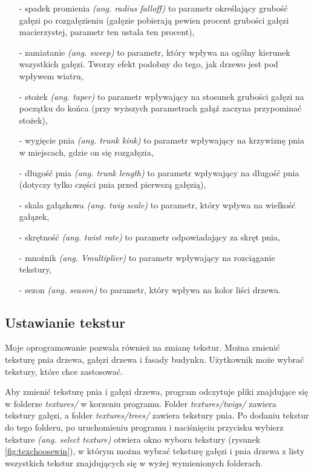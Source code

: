 \documentclass[a4paper,12pt,twoside]{book} %
\begin{document}
\begin{itemize}
	\item[-] spadek promienia \textit{(ang. radius falloff)} to parametr określający grubość gałęzi po rozgałęzieniu (gałęzie pobierają pewien procent grubości gałęzi macierzystej, parametr ten ustala ten procent),
	\item[-] zamiatanie \textit{(ang. sweep)} to parametr, który wpływa na ogólny kierunek wszystkich gałęzi. Tworzy efekt podobny do tego, jak drzewo jest pod wpływem wiatru,
	\item[-] stożek \textit{(ang. taper)} to parametr wpływający na stosunek grubości gałęzi na początku do końca (przy wyższych parametrach gałąź zaczyna przypominać stożek),
	\item[-] wygięcie pnia \textit{(ang. trunk kink)} to parametr wpływający na krzywiznę pnia w miejscach, gdzie on się rozgałęzia,
	\item[-] długość pnia \textit{(ang. trunk length)} to parametr wpływający na długość pnia (dotyczy tylko części pnia przed pierwszą gałęzią),
	\item[-] skala gałązkowa \textit{(ang. twig scale)} to parametr, który wpływa na wielkość gałązek,
	\item[-] skrętność \textit{(ang. twist rate)} to parametr odpowiadający za skręt pnia,
	\item[-] mnożnik \textit{(ang. Vmultiplier)} to parametr wpływający na rozciąganie tekstury,
	\item[-] sezon \textit{(ang. season)} to parametr, który wpływa na kolor liści drzewa.
\end{itemize}


\subsection{Ustawianie tekstur}

Moje oprogramowanie pozwala również na zmianę tekstur. 
Można zmienić teksturę pnia drzewa, gałęzi drzewa i fasady budynku.
Użytkownik może wybrać tekstury, które chce zastosować. 

Aby zmienić teksturę pnia i gałęzi drzewa, program odczytuje pliki 
znajdujące się w folderze \textit{textures/} w korzeniu programu. 
Folder \textit{textures/twigs/} zawiera tekstury gałęzi, 
a folder \textit{textures/trees/} zawiera tekstury pnia.
Po dodaniu tekstur do tego folderu, po uruchomieniu programu i 
naciśnięciu przycisku wybierz teksture \textit{(ang. select texture)} 
otwiera okno wyboru tekstury (rysunek \ref{fig:texchoosewin}), w którym 
można wybrać teksturę gałęzi i pnia drzewa z listy wszystkich tekstur 
znajdujących się w wyżej wymienionych folderach.
\end{document}
